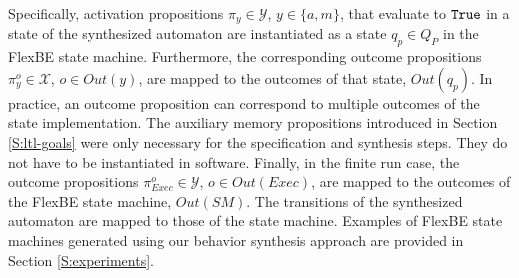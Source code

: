 Specifically, activation propositions $\pi_y \in \mathcal{Y}$, $y \in \{ a, m \}$, that evaluate to $\mathtt{True}$ in a state of the synthesized automaton are instantiated as a state $q_p \in Q_P$ in the FlexBE state machine.
Furthermore, the corresponding outcome propositions $\pi_y^o \in \mathcal{X}$, $o \in Out(y)$, are mapped to the outcomes of that state, $Out(q_p)$.
In practice, an outcome proposition can correspond to multiple outcomes of the state implementation.
The auxiliary memory propositions introduced in Section \ref{S:ltl-goals} were only necessary for the specification and synthesis steps.
They do not have to be instantiated in software.
Finally, in the finite run case, the outcome propositions $\pi_{Exec}^o \in \mathcal{Y}$, $o \in Out(Exec)$, are mapped to the outcomes of the FlexBE state machine, $Out(SM)$.
The transitions of the synthesized automaton are mapped to those of the state machine.
Examples of FlexBE state machines generated using our behavior synthesis approach are provided in Section \ref{S:experiments}.

